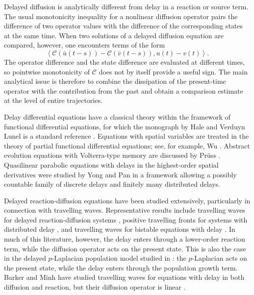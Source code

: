 \documentclass[a4paper,11pt,oneside,reqno]{amsart}
\newcounter{c}
\newcounter{d}
\newcounter{b}
\begin{document}
Delayed diffusion is analytically different from delay in a reaction or
source term. The usual monotonicity inequality for a nonlinear diffusion
operator pairs the difference of two operator values with the difference of
the corresponding states at the same time. When two solutions of a delayed
diffusion equation are compared, however, one encounters terms of the form
\[
  \left\langle
    \mathcal C(\bar u(t-s))-\mathcal C(\bar v(t-s)),
    u(t)-v(t)
  \right\rangle.
\]
The operator difference and the state difference are evaluated at different
times, so pointwise monotonicity of \(\mathcal C\) does not by itself provide
a useful sign. The main analytical issue is therefore to combine the
dissipation of the present-time operator with the contribution from the past
and obtain a comparison estimate at the level of entire trajectories.

Delay differential equations have a classical theory within the framework
of functional differential equations, for which the monograph by Hale and
Verduyn Lunel is a standard reference
\cite{HaleVerduynLunel1993IntroductionFunctionalDifferentialEquations}.
Equations with spatial variables are treated in the theory of partial
functional differential equations; see, for example, Wu
\cite{Wu1996TheoryApplicationsPartialFunctionalDifferentialEquations}.
Abstract evolution equations with Volterra-type memory are discussed by
Pr\"uss
\cite{Pruss1993EvolutionaryIntegralEquationsApplications}.
Quasilinear parabolic equations with delays in the highest-order spatial
derivatives were studied by Yong and Pan
\cite{YongPan1993QuasilinearParabolicDelaysHighestOrder}
in a framework allowing a possibly countable family of discrete delays and
finitely many distributed delays.

Delayed reaction-diffusion equations have been studied extensively,
particularly in connection with travelling waves. Representative results
include travelling waves for delayed reaction-diffusion systems
\cite{BoumenirNguyen2008PerronMonotoneIterationTravelingWaves,
TianLin2010TravelingWavesDelayedReactionDiffusionSystems},
positive travelling fronts for systems with distributed delay
\cite{FariaTrofimchuk2010PositiveTravellingFrontsDistributedDelay},
and travelling waves for bistable equations with delay
\cite{TrofimchukVolpert2018TravelingWavesBistableDelay}.
In much of this literature, however, the delay enters through a lower-order
reaction term, while the diffusion operator acts on the present state. 
This is also the case in the delayed \(p\)-Laplacian population model
studied in
\cite{YangDeng2017QualitativePropertiesPLaplacianPopulationModelDelay}:
the \(p\)-Laplacian acts on the present state, while the delay enters through
the population growth term. Barker and Minh have studied travelling waves
for equations with delay in both diffusion and reaction, but their diffusion
operator is linear
\cite{BarkerMinh2026TravelingWavesDelayedDiffusionReaction}.
\end{document}
